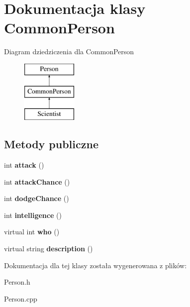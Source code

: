 \hypertarget{classCommonPerson}{}\section{Dokumentacja klasy Common\+Person}
\label{classCommonPerson}
Diagram dziedziczenia dla Common\+Person\begin{figure}[H]
\begin{center}
\leavevmode
\includegraphics[height=3.000000cm]{classCommonPerson}
\end{center}
\end{figure}
\subsection*{Metody publiczne}
\begin{DoxyCompactItemize}
\item 
int {\bfseries attack} ()\hypertarget{classCommonPerson_aa6124a1a40f875cb3d739dee53af1724}{}\label{classCommonPerson_aa6124a1a40f875cb3d739dee53af1724}

\item 
int {\bfseries attack\+Chance} ()\hypertarget{classCommonPerson_a1334a830f0d44df46ea92cd7ef2ebc29}{}\label{classCommonPerson_a1334a830f0d44df46ea92cd7ef2ebc29}

\item 
int {\bfseries dodge\+Chance} ()\hypertarget{classCommonPerson_a8de900c43b59c0c14e896d4cba68cb76}{}\label{classCommonPerson_a8de900c43b59c0c14e896d4cba68cb76}

\item 
int {\bfseries intelligence} ()\hypertarget{classCommonPerson_acf2a1d582a17534ea43da4e51cde5b3b}{}\label{classCommonPerson_acf2a1d582a17534ea43da4e51cde5b3b}

\item 
virtual int {\bfseries who} ()\hypertarget{classCommonPerson_af0b8d634f112c3f9d564124700758c6f}{}\label{classCommonPerson_af0b8d634f112c3f9d564124700758c6f}

\item 
virtual string {\bfseries description} ()\hypertarget{classCommonPerson_a50960e537f0353dbd8bee7a53b7963e3}{}\label{classCommonPerson_a50960e537f0353dbd8bee7a53b7963e3}

\end{DoxyCompactItemize}


Dokumentacja dla tej klasy została wygenerowana z plików\+:\begin{DoxyCompactItemize}
\item 
Person.\+h\item 
Person.\+cpp\end{DoxyCompactItemize}
